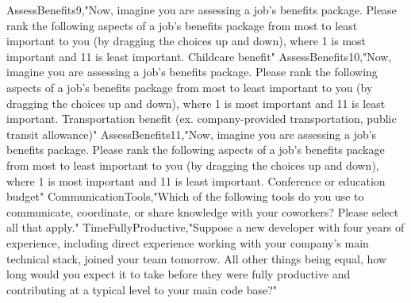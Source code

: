 \begin{appendices}
AssessBenefits9,"Now, imagine you are assessing a job's benefits package. Please rank the following aspects of a job's benefits package from most to least important to you (by dragging the choices up and down), where 1 is most important and 11 is least important. Childcare benefit"
AssessBenefits10,"Now, imagine you are assessing a job's benefits package. Please rank the following aspects of a job's benefits package from most to least important to you (by dragging the choices up and down), where 1 is most important and 11 is least important. Transportation benefit (ex. company-provided transportation, public transit allowance)"
AssessBenefits11,"Now, imagine you are assessing a job's benefits package. Please rank the following aspects of a job's benefits package from most to least important to you (by dragging the choices up and down), where 1 is most important and 11 is least important. Conference or education budget"
CommunicationTools,"Which of the following tools do you use to communicate, coordinate, or share knowledge with your coworkers? Please select all that apply."
TimeFullyProductive,"Suppose a new developer with four years of experience, including direct experience working with your company's main technical stack, joined your team tomorrow.  All other things being equal, how long would you expect it to take before they were fully productive and contributing at a typical level to your main code base?"



\end{appendices}
